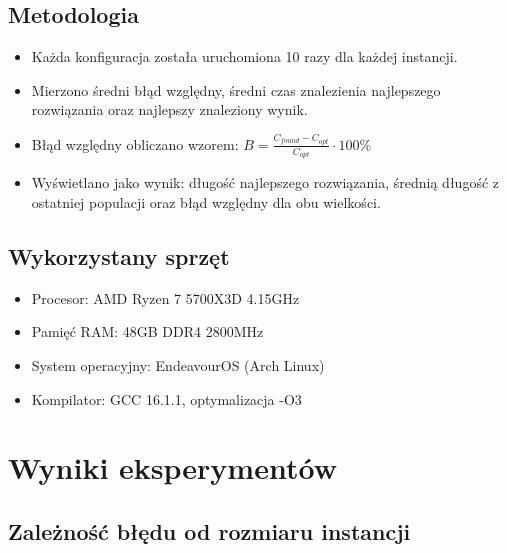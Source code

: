\documentclass[a4paper,12pt]{article}
\begin{document}
\subsection{Metodologia}

\begin{itemize}
    \item Każda konfiguracja została uruchomiona 10 razy dla każdej instancji.
    \item Mierzono średni błąd względny, średni czas znalezienia najlepszego rozwiązania oraz najlepszy znaleziony wynik.
    \item Błąd względny obliczano wzorem: $B = \frac{C_{found} - C_{opt}}{C_{opt}} \cdot 100\%$
    \item Wyświetlano jako wynik: długość najlepszego rozwiązania, średnią długość z ostatniej populacji oraz błąd względny dla obu wielkości.
\end{itemize}

\subsection{Wykorzystany sprzęt}

\begin{itemize}
    \item Procesor: AMD Ryzen 7 5700X3D 4.15GHz
    \item Pamięć RAM: 48GB DDR4 2800MHz
    \item System operacyjny: EndeavourOS (Arch Linux)
    \item Kompilator: GCC 16.1.1, optymalizacja -O3
\end{itemize}

\section{Wyniki eksperymentów}

\subsection{Zależność błędu od rozmiaru instancji}
\end{document}
